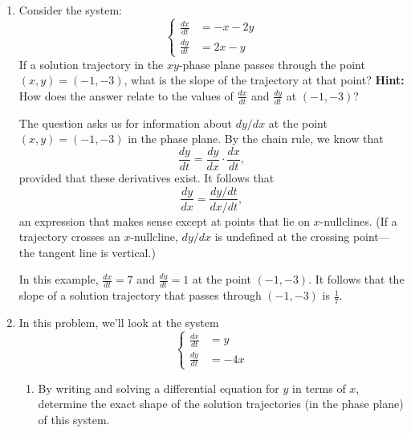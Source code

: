 \documentclass[main]{subfiles}
\begin{document}
\begin{enumerate}

  \item 
  \begin{problem}[1in]
  Consider the system:
  \[\left\{\begin{aligned}
  \frac{dx}{dt} &= -x - 2y\\
  \frac{dy}{dt} &= 2x - y
  \end{aligned}\right.\]
  If a solution trajectory in the
  $xy$-phase plane passes through the point $(x,y) = (-1,-3)$, what 
  is the slope of the trajectory at that point?
  \textbf{Hint:} How does the answer relate to the values of $\displaystyle \frac{dx}{dt}$ 
  and $\displaystyle \frac{dy}{dt}$ at $(-1,-3)$?
  \end{problem}

  \begin{solution}
  The question asks us for information about $dy/dx$ at the point
  $(x,y) = (-1,-3)$ in the phase plane.  By the chain rule, we know
  that 
  $$
    \frac{dy}{dt} = \frac{dy}{dx}\cdot \frac{dx}{dt},
  $$
  provided that these derivatives exist.  It follows that
  $$
    \frac{dy}{dx} = \frac{dy/dt}{dx/dt},
  $$
  an expression that makes sense except at points that lie on
  $x$-nullclines.  (If a trajectory crosses an $x$-nullcline,
  $dy/dx$ is undefined at the crossing point---the tangent line
  is vertical.)

  In this example, $\frac{dx}{dt} = 7$ and $\frac{dy}{dt} = 1$ at the
  point $(-1, -3)$.  It follows that the slope of a solution trajectory
  that passes through $(-1,-3)$ is $\boxed{\frac{1}{7}}$.
  \end{solution}





  \item 
  In this problem, we'll look at the system 
 \[\left\{\begin{aligned}
  \frac{dx}{dt} &=y\\
  \frac{dy}{dt} &= -4x
  \end{aligned}
\right.\]
  \begin{enumerate}
    \item
    \begin{problem}[\vfill]
    By writing and solving a differential equation for $y$ in terms of
    $x$, determine the exact shape of the solution trajectories (in the
    phase plane) of this system.
    \end{problem}


\end{enumerate}
\end{enumerate}
\end{document}
